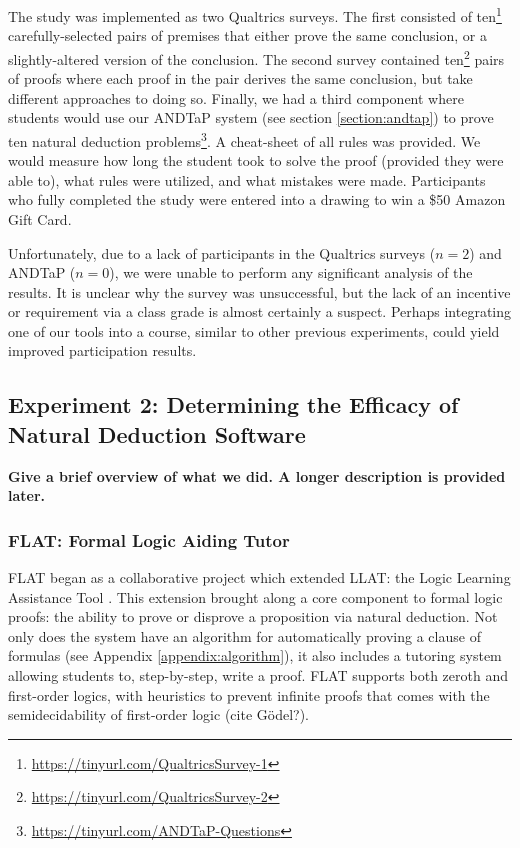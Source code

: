 \documentclass[ms]{uncgdissertationexp2}
\theoremstyle{plain}
\theoremstyle{definition}
\theoremstyle{remark}
\begin{document}
The study was implemented as two Qualtrics surveys. The first consisted of ten\footnote{\url{https://tinyurl.com/QualtricsSurvey-1}} carefully-selected pairs of premises that either prove the same conclusion, or a slightly-altered version of the conclusion. The second survey contained ten\footnote{\url{https://tinyurl.com/QualtricsSurvey-2}} pairs of proofs where each proof in the pair derives the same conclusion, but take different approaches to doing so. Finally, we had a third component where students would use our ANDTaP system (see section \ref{section:andtap}) to prove ten natural deduction problems\footnote{\url{https://tinyurl.com/ANDTaP-Questions}}. A cheat-sheet of all rules was provided. We would measure how long the student took to solve the proof (provided they were able to), what rules were utilized, and what mistakes were made. Participants who fully completed the study were entered into a drawing to win a \$50 Amazon Gift Card.

Unfortunately, due to a lack of participants in the Qualtrics surveys ($n=2$) and ANDTaP ($n=0$), we were unable to perform any significant analysis of the results. It is unclear why the survey was unsuccessful, but the lack of an incentive or requirement via a class grade is almost certainly a suspect. Perhaps integrating one of our tools into a course, similar to other previous experiments, could yield improved participation results.

\subsection{Experiment 2: Determining the Efficacy of Natural Deduction Software}
\textbf{Give a brief overview of what we did. A longer description is provided later.}

\subsubsection{FLAT: Formal Logic Aiding Tutor} \label{section:flat}
FLAT began as a collaborative project which extended LLAT: the Logic Learning Assistance Tool \cite{llat}. This extension brought along a core component to formal logic proofs: the ability to prove or disprove a proposition via natural deduction. Not only does the system have an algorithm for automatically proving a clause of formulas (see Appendix \ref{appendix:algorithm}), it also includes a tutoring system allowing students to, step-by-step, write a proof. FLAT supports both zeroth and first-order logics, with heuristics to prevent infinite proofs that comes with the semidecidability of first-order logic (cite G\"odel?).
\end{document}
